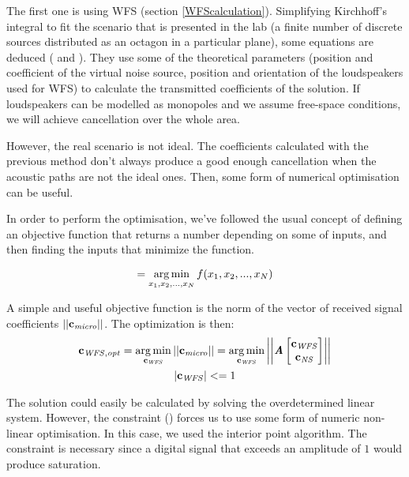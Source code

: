 The first one is using WFS (section \ref{WFScalculation}). Simplifying Kirchhoff's integral to fit the scenario that is presented in the lab (a finite number of discrete sources distributed as an octagon in a particular plane), some equations are deduced ( and ). They use some of the theoretical parameters (position and coefficient of the virtual noise source, position and orientation of the loudspeakers used for WFS) to calculate the transmitted coefficients of the solution. If loudspeakers can be modelled as monopoles and we assume free-space conditions, we will achieve cancellation over the whole area.

However, the real scenario is not ideal. The coefficients calculated with the previous method don't always produce a good enough cancellation when the acoustic paths are not the ideal ones. Then, some form of numerical optimisation can be useful.

In order to perform the optimisation, we've followed the usual concept of defining an objective function that returns a number depending on some of inputs, and then finding the inputs that minimize the function.

\begin{equation}
[x_{\mathit{opt} (1)}, x_{\mathit{opt} (1)}, ..., x_{\mathit{opt} (N)}] = \argmin_{x_1, x_2, ..., x_N} f(x_1, x_2, ..., x_N)
\label{optimisationGeneral}
\end{equation}

A simple and useful objective function is the norm of the vector of received signal coefficients $\left|\left| \mathbf{c_\mathit{micro}} \right|\right|$. The optimization is then:
\begin{gather}
\mathbf{c_{\mathit{WFS}, \mathit{opt}}} =
\operatorname*{arg\,min}_{\mathbf{c_\mathit{WFS}}}
\left|\left| \mathbf{c_\mathit{micro}} \right|\right| =
\operatorname*{arg\,min}_{\mathbf{c_\mathit{WFS}}}
\left|\left| \bm{\mathit{A}}
\begin{bmatrix}
\mathbf{c_\mathit{WFS}}\\
\mathbf{c_\mathit{NS}}\\
\end{bmatrix}
 \right|\right| \\
\left | \mathbf{c_{\mathit{WFS}}} \right | <= 1
\label{OptConstraint}
\end{gather}


The solution could easily be calculated by solving the overdetermined linear system. However, the constraint () forces us to use some form of numeric non-linear optimisation. In this case, we used the interior point algorithm. The constraint is necessary since a digital signal that exceeds an amplitude of $1$ would produce saturation.

